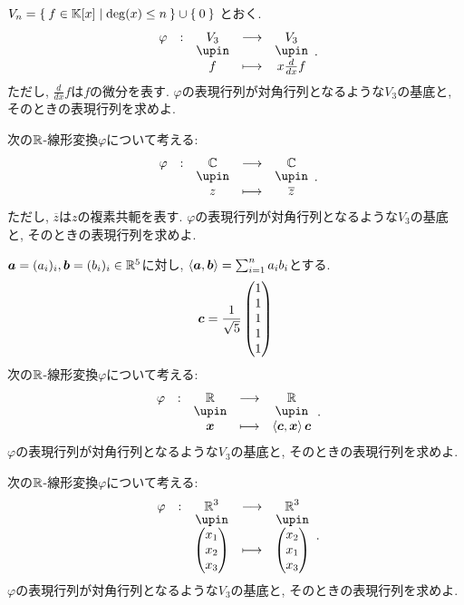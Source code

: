 \begin{quiz}
  $V_n=\Set{f\in \mathbb{K}[x] |\deg(x) \leq n}\cup\Set{0}$
  とおく.
  \begin{align*}
    \shazo{\varphi}{V_3}{V_3}
    {f}{x\frac{d}{dx}f}.
  \end{align*}
  ただし, $\frac{d}{dx}f$は$f$の微分を表す.
  $\varphi$の表現行列が対角行列となるような$V_3$の基底と,
  そのときの表現行列を求めよ.
\end{quiz}

\begin{quiz}
  次の$\mathbb{R}$-線形変換$\varphi$について考える:
  \begin{align*}
    \shazo{\varphi}{\CC}{\CC}
    {z}{\overline{z}}.
  \end{align*}
  ただし, $\overline{z}$は$z$の複素共軛を表す.
  $\varphi$の表現行列が対角行列となるような$V_3$の基底と,
  そのときの表現行列を求めよ.
\end{quiz}

\begin{quiz}
  $\boldsymbol{a}=(a_i)_{i}, \boldsymbol{b}=(b_i)_i \in \mathbb{R}^5$に対し,
  $\Braket{\boldsymbol{a},\boldsymbol{b}}=\sum_{i=1}^na_ib_i$とする.
  \begin{align*}
    \boldsymbol{c}=\frac{1}{\sqrt 5}\begin{pmatrix}1\\1\\1\\1\\1\end{pmatrix}
  \end{align*}  
  次の$\mathbb{R}$-線形変換$\varphi$について考える:
  \begin{align*}
    \shazo{\varphi}{\RR}{\RR}
    {\xx}{\Braket{\ccc,\xx}\ccc}.
  \end{align*}
  $\varphi$の表現行列が対角行列となるような$V_3$の基底と,
  そのときの表現行列を求めよ.
\end{quiz}


\begin{quiz}
  次の$\mathbb{R}$-線形変換$\varphi$について考える:
  \begin{align*}
    \shazo{\varphi}{\RR^3}{\RR^3}
    {\begin{pmatrix}x_1\\x_2\\x_3\end{pmatrix}}{\begin{pmatrix}x_2\\x_1\\x_3\end{pmatrix}}.
  \end{align*}
  $\varphi$の表現行列が対角行列となるような$V_3$の基底と,
  そのときの表現行列を求めよ.
\end{quiz}

